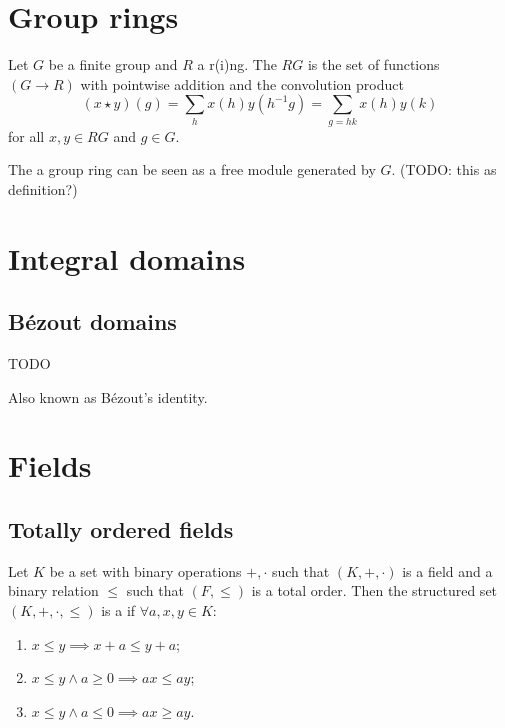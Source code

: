 \section{Group rings}
\begin{definition}
Let $G$ be a finite group and $R$ a r(i)ng. The  $RG$ is the set of functions $(G\to R)$ with pointwise addition and the convolution product
\[ (x\star y)(g) = \sum_h x(h)y(h^{-1}g) = \sum_{g=hk}x(h)y(k) \]
for all $x,y\in RG$ and $g\in G$. 
\end{definition}
The a group ring can be seen as a free module generated by $G$. (TODO: this as definition?)

\section{Integral domains}

\subsection{Bézout domains}
\begin{theorem}
TODO
\end{theorem}
Also known as Bézout's identity.

\section{Fields}
\subsection{Totally ordered fields}
\begin{definition}
Let $K$ be a set with binary operations $+,\cdot$ such that $(K,+,\cdot)$ is a field and a binary relation $\leq$ such that $(F,\leq)$ is a total order. Then the structured set $(K,+,\cdot,\leq)$ is a  if $\forall a,x,y\in K$:
\begin{enumerate}
\item $x\leq y \implies x+a \leq y+a$;
\item $x\leq y \land a\geq 0 \implies ax \leq ay$;
\item $x\leq y \land a\leq 0 \implies ax \geq ay$.
\end{enumerate}
\end{definition}

